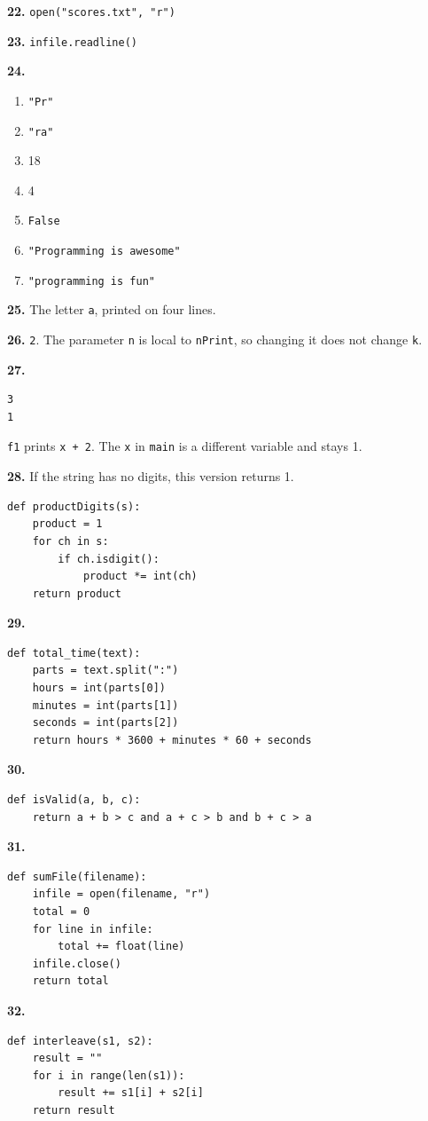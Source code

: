 \documentclass[11pt]{article}
\begin{document}
\textbf{22.} \texttt{open("scores.txt", "r")}

\textbf{23.} \texttt{infile.readline()}

\textbf{24.}
\begin{enumerate}
    \item[a.] \texttt{"Pr"}
    \item[b.] \texttt{"ra"}
    \item[c.] 18
    \item[d.] 4
    \item[e.] \texttt{False}
    \item[f.] \texttt{"Programming is awesome"}
    \item[g.] \texttt{"programming is fun"}
\end{enumerate}

\textbf{25.} The letter \texttt{a}, printed on four lines.

\textbf{26.} \texttt{2}. The parameter \texttt{n} is local to \texttt{nPrint}, so changing it does not change \texttt{k}.

\textbf{27.}
\begin{lstlisting}
3
1
\end{lstlisting}
\texttt{f1} prints \texttt{x + 2}. The \texttt{x} in \texttt{main} is a different variable and stays 1.

\textbf{28.} If the string has no digits, this version returns 1.
\begin{lstlisting}
def productDigits(s):
    product = 1
    for ch in s:
        if ch.isdigit():
            product *= int(ch)
    return product
\end{lstlisting}

\textbf{29.}
\begin{lstlisting}
def total_time(text):
    parts = text.split(":")
    hours = int(parts[0])
    minutes = int(parts[1])
    seconds = int(parts[2])
    return hours * 3600 + minutes * 60 + seconds
\end{lstlisting}

\textbf{30.}
\begin{lstlisting}
def isValid(a, b, c):
    return a + b > c and a + c > b and b + c > a
\end{lstlisting}

\textbf{31.}
\begin{lstlisting}
def sumFile(filename):
    infile = open(filename, "r")
    total = 0
    for line in infile:
        total += float(line)
    infile.close()
    return total
\end{lstlisting}

\textbf{32.}
\begin{lstlisting}
def interleave(s1, s2):
    result = ""
    for i in range(len(s1)):
        result += s1[i] + s2[i]
    return result
\end{lstlisting}
\end{document}
